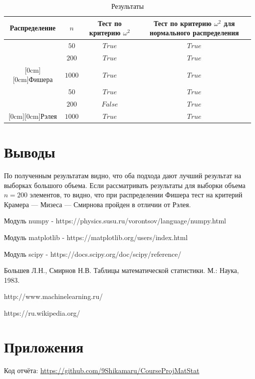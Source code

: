 \documentclass[a4]{article}
\begin{document}
\begin{table}[H]
\caption{Результаты}
\label{tab:my_label1}
\begin{center}
\vspace{5mm}
\begin{tabular}{|c|c|c|c|}
\hline
Распределение & $n$&Тест по критерию $\omega^2$ & Тест по критерию $\omega^2$ для нормального распределения \\
\hline
&$50$&	$True$&		$True$ \\
\cline{2-4}
&$200$&	$True$&		$True$ \\
\cline{2-4}
\raisebox{1.5ex}[0cm][0cm]{Фишера}&$1000$&	$True$&		$True$\\
\hline
&50&	$True$&		$True$ \\
\cline{2-4}
&$200$&	$False$&		$True$ \\
\cline{2-4}
\raisebox{1.5ex}[0cm][0cm]{Рэлея}&$1000$&	$True$&	$True$\\
\hline
\end{tabular}
\end{center}
\end{table}

\section{Выводы}

По полученным результатам видно, что оба подхода дают лучший результат на выборках большого объема. Если рассматривать результаты для выборки объема $n=200$ элементов, то видно, что при распределении Фишера тест на критерий Крамера — Мизеса — Смирнова пройден в отличии от Рэлея.

\begin{thebibliography}{}
      Модуль numpy  -  https://physics.susu.ru/vorontsov/language/numpy.html
    
    Модуль matplotlib - https://matplotlib.org/users/index.html
    
    Модуль scipy - https://docs.scipy.org/doc/scipy/reference/
    

Большев Л.Н., Смирнов Н.В. Таблицы математической статистики. М.: Наука, 1983.

http://www.machinelearning.ru/

https://ru.wikipedia.org/

\end{thebibliography}

\section{Приложения}


Код отчёта:\; \url{https://github.com/9Shikamaru/CourseProjMatStat}
\end{document}
